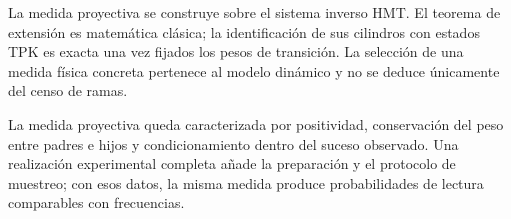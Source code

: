 \begin{statusbox}
La medida proyectiva se construye sobre el sistema inverso HMT.
El teorema de extensión es matemática clásica; la identificación de sus
cilindros con estados TPK es exacta una vez fijados los pesos de transición.
La selección de una medida física concreta pertenece al modelo dinámico y no
se deduce únicamente del censo de ramas.
\end{statusbox}

La medida proyectiva queda caracterizada por positividad, conservación del
peso entre padres e hijos y condicionamiento dentro del suceso observado. Una
realización experimental completa añade la preparación y el protocolo de
muestreo; con esos datos, la misma medida produce probabilidades de lectura
comparables con frecuencias.
